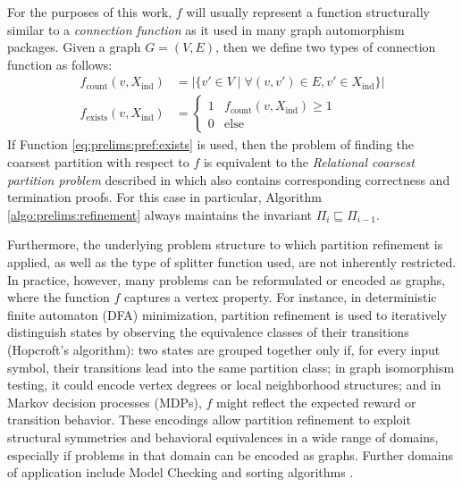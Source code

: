 		For the purposes of this work, $f$ will usually represent a function structurally similar to a \textit{connection function} as it used in many graph automorphism packages.
		Given a graph $G = (V, E)$, then we define two types of connection function as follows:
		\begin{align}
			f_{\mathrm{count}}(v, X_{\mathrm{ind}}) &= \left| \{ v' \in V \mid \forall (v, v') \in E, v' \in X_{\mathrm{ind}} \} \right| \label{eq:prelims:pref:count} \\
			f_{\mathrm{exists}}(v, X_{\mathrm{ind}}) &= \begin{cases}
				1 & f_{\mathrm{count}}(v, X_{\mathrm{ind}}) \geq 1 \label{eq:prelims:pref:exists} \\
				0 & \mathrm{else}
			\end{cases}
		\end{align}
		If Function \ref{eq:prelims:pref:exists} is used, then the problem of finding the coarsest partition with respect to $f$ is equivalent to the \textit{Relational coarsest partition problem} described in  \cite{paigeThreePartitionRefinement1987} which also contains corresponding correctness and termination proofs.
		For this case in particular, Algorithm \ref{algo:prelims:refinement} always maintains the invariant $\Pi_i \sqsubseteq \Pi_{i-1}$.
		
		Furthermore, the underlying problem structure to which partition refinement is applied, as well as the type of splitter function used, are not inherently restricted. In practice, however, many problems can be reformulated or encoded as graphs, where the function $f$ captures a vertex property. 
		For instance, in deterministic finite automaton (DFA) minimization, partition refinement is used to iteratively distinguish states by observing the equivalence classes of their transitions (Hopcroft's algorithm): two states are grouped together only if, for every input symbol, their transitions lead into the same partition class; in graph isomorphism testing, it could encode vertex degrees or local neighborhood structures; and in Markov decision processes (MDPs), $f$ might reflect the expected reward or transition behavior.
		These encodings allow partition refinement to exploit structural symmetries and behavioral equivalences in a wide range of domains, especially if problems in that domain can be encoded as graphs. 
		Further domains of application include Model Checking \cite{baierPrinciplesModelChecking2008} and sorting algorithms \cite{mehlhornAlgorithmsDataStructures2008}.
	
